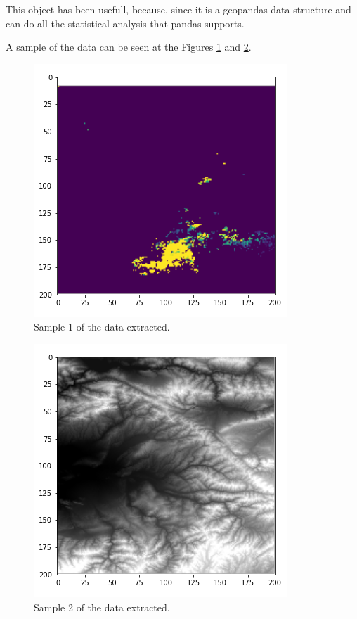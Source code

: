 \documentclass[sigconf, nonacm]{acmart}
\begin{document}
This object has been usefull, because, since it is a geopandas data structure and can do all the statistical analysis that pandas supports.

A sample of the data can be seen at the Figures \ref{fig:culia1} and \ref{fig:culia2}.

\begin{figure}
  \centering
  \includegraphics[width=0.8\linewidth]{figures/Imagen_CUlia_1.png}
  \caption{Sample 1 of the data extracted.}
  \label{fig:culia1}
\end{figure}

 \begin{figure}
  \centering
  \includegraphics[width=0.8\linewidth]{figures/imagen_culia_2.png}
  \caption{Sample 2 of the data extracted.}
  \label{fig:culia2}
\end{figure}
\end{document}

